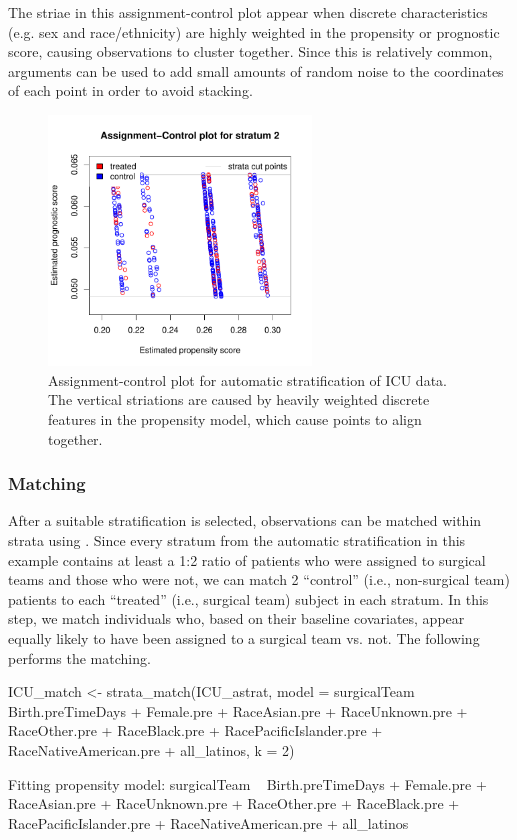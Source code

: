 The striae in this assignment-control plot appear when discrete characteristics (e.g. sex and race/ethnicity) are highly weighted in the propensity or prognostic score, causing observations to cluster together.  Since this is relatively common,  arguments can be used to add small amounts of random noise to the coordinates of each point in order to avoid stacking.

 \begin{figure}[t!]
\centering
\includegraphics[width = 2.75in]{Figure4}
\caption{\label{fig:AC_applied} Assignment-control plot for automatic stratification of ICU data.  The vertical striations are caused by heavily weighted discrete features in the propensity model, which cause points to align together.}
\end{figure}

\subsubsection{Matching}\label{subsubsec:real_matching}

After a suitable stratification is selected, observations can be matched within strata using .  Since every stratum from the automatic stratification in this example contains at least a 1:2 ratio of patients who were assigned to surgical teams and those who were not, we can match 2 ``control'' (i.e., non-surgical team) patients to each ``treated'' (i.e., surgical team) subject in each stratum.  In this step, we match individuals who, based on their baseline covariates, appear equally likely to have been assigned to a surgical team vs. not.  
The following performs the matching.

\begin{example}
ICU_match <- strata_match(ICU_astrat, 
     model = surgicalTeam ~ Birth.preTimeDays + Female.pre +
      RaceAsian.pre + RaceUnknown.pre + RaceOther.pre + RaceBlack.pre + 
      RacePacificIslander.pre + RaceNativeAmerican.pre + all_latinos,
    k = 2)
\end{example}
\begin{example}
Fitting propensity model: surgicalTeam ~ Birth.preTimeDays + Female.pre +
RaceAsian.pre + RaceUnknown.pre + RaceOther.pre + RaceBlack.pre +
RacePacificIslander.pre + RaceNativeAmerican.pre + all_latinos
\end{example}

